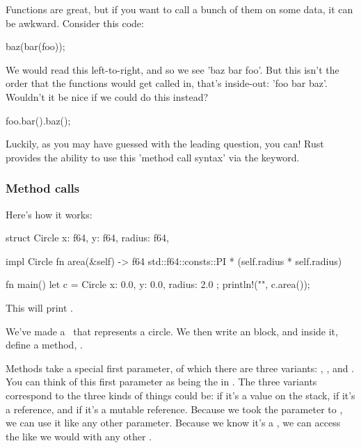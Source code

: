 Functions are great, but if you want to call a bunch of them on some data, it can be awkward. Consider this code:

\begin{rustc}
baz(bar(foo));
\end{rustc}

We would read this left-to-right, and so we see 'baz bar foo'. But this isn't the order that the functions would get called in, that's 
inside-out: 'foo bar baz'. Wouldn't it be nice if we could do this instead?

\begin{rustc}
foo.bar().baz();
\end{rustc}

Luckily, as you may have guessed with the leading question, you can! Rust provides the ability to use this 'method call syntax' via the 
 keyword.

\subsubsection*{Method calls}

Here's how it works:

\begin{rustc}
struct Circle {
    x: f64,
    y: f64,
    radius: f64,
}

impl Circle {
    fn area(&self) -> f64 {
        std::f64::consts::PI * (self.radius * self.radius)
    }
}

fn main() {
    let c = Circle { x: 0.0, y: 0.0, radius: 2.0 };
    println!("{}", c.area());
}
\end{rustc}

This will print .

We've made a \struct\ that represents a circle. We then write an  block, and inside it, define a method, .

\blank

Methods take a special first parameter, of which there are three variants: , , and . You can think 
of this first parameter as being the  in . The three variants correspond to the three kinds of things  
could be:  if it's a value on the stack,  if it's a reference, and  if it's a mutable reference. 
Because we took the  parameter to , we can use it like any other parameter. Because we know it's a , 
we can access the  like we would with any other \struct.


